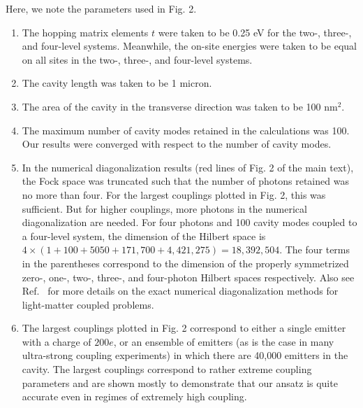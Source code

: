 \documentclass[aps,prb,onecolumn,preprint,
	groupedaddress,superscriptaddress,
	amsfonts,amssymb,amsmath,floatfix,
	citeautoscript]{revtex4-1}
\begin{document}
Here, we note the parameters used in Fig. 2.
\begin{enumerate}
\item{The hopping matrix elements $t$ were taken to be 0.25 eV for the two-, three-, and four-level systems. Meanwhile, the on-site energies were taken to be equal on all sites in the two-, three-, and four-level systems.}
\item{The cavity length was taken to be 1 micron.}
\item{The area of the cavity in the transverse direction was taken to be 100 nm$^2$.}
\item{The maximum number of cavity modes retained in the calculations was 100. Our results were converged with respect to the number of cavity modes.}
\item{In the numerical diagonalization results (red lines of Fig. 2 of the main text), the Fock space was truncated such that the number of photons retained was no more than four. For the largest couplings plotted in Fig. 2, this was sufficient. But for higher couplings, more photons in the numerical diagonalization are needed. For four photons and 100 cavity modes coupled to a four-level system, the dimension of the Hilbert space is  $4\times \left( 1 + 100 + 5050 + 171,700 + 4,421,275 \right) = 18,392,504$. The four terms in the parentheses correspond to the dimension of the properly symmetrized zero-, one-, two-, three-, and four-photon Hilbert spaces respectively. Also see Ref.~\cite{flick2017} for more details on the exact numerical diagonalization methods for light-matter coupled problems.}
\item{The largest couplings plotted in Fig. 2 correspond to either a single emitter with a charge of $200e$, or an ensemble of emitters (as is the case in many ultra-strong coupling experiments) in which there are 40,000 emitters in the cavity. The largest couplings correspond to rather extreme coupling parameters and are shown mostly to demonstrate that our ansatz is quite accurate even in regimes of extremely high coupling.}
\end{enumerate}



\end{document}
